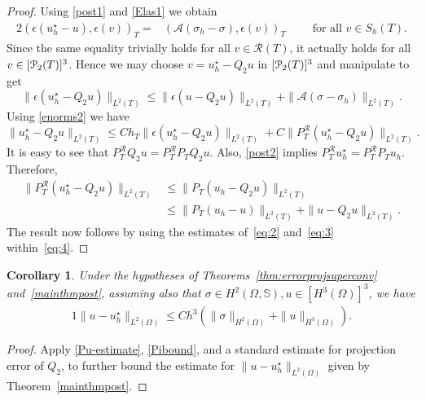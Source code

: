 \documentclass[12pt]{amsart}
\numberwithin{equation}{section}
\newtheorem{corollary}[theorem]{Corollary}
\theoremstyle{definition}
\theoremstyle{remark}
\renewcommand{\(}{\bigl(}
\renewcommand{\)}{\bigr)}
\newcommand{\ust}{u^\star}
\newcommand{\pol}{\EuScript{P}}
\newcommand{\Aa}{\mathcal{A}}
\newcommand{\RM}{\mathcal{R}}
\begin{document}
\begin{proof}
Using \eqref{post1} and \eqref{Elas1} we obtain
\begin{alignat}{2}
(\epsilon(\ust_h-u), \epsilon(v))_T=& (\Aa (\sigma_h-\sigma), \epsilon(v))_T  \qquad \text{ for all } v \in S_h(T).
\end{alignat}
Since the same equality trivially holds for all $v \in \RM(T)$, it actually
holds for all $v \in [\pol_2(T)]^3$. Hence we may choose $v = u_h^\star - Q_2u$ in
$[\pol_2(T)]^3$ and manipulate to get 
\begin{equation}
  \label{eq:2}
\|\epsilon(\ust_h-Q_2 u)\|_{L^2(T)} \le  \|\epsilon(u-Q_2u)\|_{L^2(T)}+ \|\Aa(\sigma-\sigma_h)\|_{L^2(T)}.
\end{equation}
Using \eqref{enorms2} we have
\begin{equation}
  \label{eq:4}
  \|\ust_h-Q_2u\|_{L^2(T)} \le C h_T \|\epsilon(\ust_h-Q_2u)\|_{L^2(T)}+ C \| P_T^\RM (\ust_h-Q_2u)\|_{L^2(T)}. 
\end{equation}
It is easy to see that $P_T^\RM Q_2 u = P_T^\RM P_T Q_2 u$. Also,
\eqref{post2} implies $P_T^\RM u_h^\star = P_T^\RM P_T u_h$. 
Therefore, 
\begin{align}
  \nonumber 
  \| P_T^\RM (\ust_h-Q_2u)\|_{L^2(T)}  & \le \| P_T(u_h-Q_2 u)\|_{L^2(T)}
  \\ \label{eq:3}
  & \le \| P_T(u_h- u)\|_{L^2(T)}+ \| u- Q_2 u\|_{L^2(T)}.
\end{align}
The result now follows by using the estimates of~\eqref{eq:2}
and~\eqref{eq:3} within~\eqref{eq:4}.
\end{proof}


\begin{corollary}
  Under the hypotheses of
  Theorems~\ref{thm:errorprojsuperconv} and~\ref{mainthmpost}, 
  assuming also that $\sigma \in H^2(\Omega, \mathbb{S}), u \in [H^3(\Omega)]^3$,
  we have 
\begin{alignat*}{1}
  \|u-\ust_h\|_{L^2(\Omega)} \le   C h^3 (\|\sigma\|_{H^2(\Omega)}+ \|u\|_{H^3(\Omega)}).
\end{alignat*}
\end{corollary}
\begin{proof}
  Apply \eqref{Pu-estimate}, \eqref{Pibound}, and a standard estimate
  for projection error of $Q_2$, to further bound the estimate for
  $\|u-\ust_h\|_{L^2(\Omega)} $ given by Theorem~\ref{mainthmpost}.
\end{proof}
%
\end{document}
